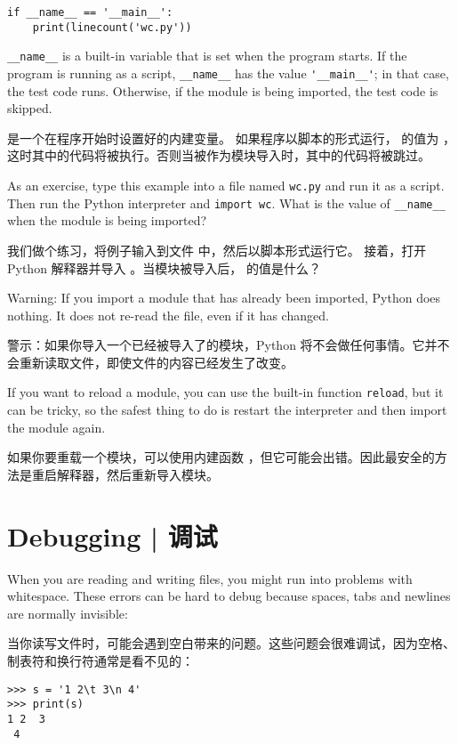 {{{{{{{\begin{lstlisting}
if __name__ == '__main__':
    print(linecount('wc.py'))
\end{lstlisting}
%
\verb"__name__" is a built-in variable that is set when the
program starts.  If the program is running as a script,
\verb"__name__" has the value \verb"'__main__'"; in that
case, the test code runs.  Otherwise,
if the module is being imported, the test code is skipped.

 是一个在程序开始时设置好的内建变量。  
如果程序以脚本的形式运行， 的值为  ，这时其中的代码将被执行。否则当被作为模块导入时，其中的代码将被跳过。

As an exercise, type this example into a file named {\tt wc.py} and run
it as a script.  Then run the Python interpreter and
{\tt import wc}.  What is the value of \verb"__name__"
when the module is being imported?

我们做个练习，将例子输入到文件  中，然后以脚本形式运行它。
接着，打开 Python 解释器并导入  。当模块被导入后，  的值是什么？

Warning: If you import a module that has already been imported,
Python does nothing.  It does not re-read the file, even if it has
changed.

警示：如果你导入一个已经被导入了的模块，Python 将不会做任何事情。它并不会重新读取文件，即使文件的内容已经发生了改变。
  

If you want to reload a module, you can use the built-in function
{\tt reload}, but it can be tricky, so the safest thing to do is
restart the interpreter and then import the module again.

如果你要重载一个模块，可以使用内建函数  ，但它可能会出错。因此最安全的方法是重启解释器，然后重新导入模块。

\section{Debugging  |  调试}
  

When you are reading and writing files, you might run into problems
with whitespace.  These errors can be hard to debug because spaces,
tabs and newlines are normally invisible:

当你读写文件时，可能会遇到空白带来的问题。这些问题会很难调试，因为空格、制表符和换行符通常是看不见的：

\begin{lstlisting}
>>> s = '1 2\t 3\n 4'
>>> print(s)
1 2  3
 4
\end{lstlisting}
  

}}}}}}}
